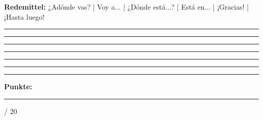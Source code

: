 \documentclass[11pt, a4paper]{article}
\newcommand{\maxpunkte}{20}
\newcommand{\luecke}[1]{\rule{#1}{0.4pt}}
\begin{document}
\begin{hinweis}
\textbf{Redemittel:} ¿Adónde vas? | Voy a... | ¿Dónde está...? | Está en... | ¡Gracias! | ¡Hasta luego!
\end{hinweis}

\vspace{0.5em}

\noindent\rule{\textwidth}{0.4pt}\vspace{8pt}
\noindent\rule{\textwidth}{0.4pt}\vspace{8pt}
\noindent\rule{\textwidth}{0.4pt}\vspace{8pt}
\noindent\rule{\textwidth}{0.4pt}\vspace{8pt}
\noindent\rule{\textwidth}{0.4pt}\vspace{8pt}
\noindent\rule{\textwidth}{0.4pt}\vspace{8pt}

\vspace{20pt}
\hrule
\vspace{10pt}

\begin{flushright}
\textbf{Punkte:} \luecke{1cm} / \maxpunkte
\end{flushright}
\end{document}
